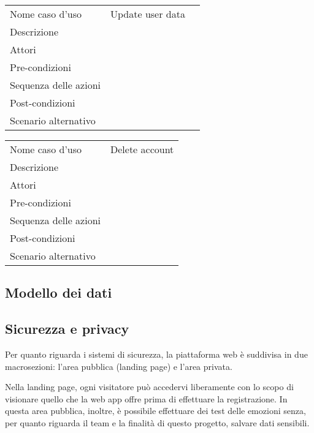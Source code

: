 \begin{table}[H]
	\centering
	\caption{Use Case: Update user data}
	\label{tab:use-case-user-data-update}
	\begin{longtable}{@{}|>{\centering\arraybackslash}m{}|m{}|>{\centering\arraybackslash}m{}|@{}}
		Nome caso d'uso & Update user data \\
		Descrizione & \\
		Attori & \\
		Pre-condizioni & \\
		Sequenza delle azioni & \\
		Post-condizioni & \\
		Scenario alternativo & \\

	\end{longtable}
\end{table}

\begin{table}[H]
	\centering
	\caption{Use Case: Delete account}
	\label{tab:use-case-delete-account}
	\rowcolors{2}{gray!25}{white!0}
	\begin{longtable}{@{}|>{\centering\arraybackslash}m{}|m{}}
		Nome caso d'uso & Delete account \\
		Descrizione & \\
		Attori & \\
		Pre-condizioni & \\
		Sequenza delle azioni & \\
		Post-condizioni & \\
		Scenario alternativo & 
	\end{longtable}
\end{table}

\subsection{Modello dei dati}

\subsection{Sicurezza e privacy}
Per quanto riguarda i sistemi di sicurezza, la piattaforma web è suddivisa in 
due macrosezioni: l'area pubblica (landing page) e l'area privata.

Nella landing page, ogni visitatore può accedervi liberamente con lo scopo di 
visionare quello che la web app offre prima di effettuare la registrazione. In 
questa area pubblica, inoltre, è possibile effettuare dei test delle emozioni 
senza, per quanto riguarda il team e la finalità di questo progetto, salvare 
dati sensibili.

